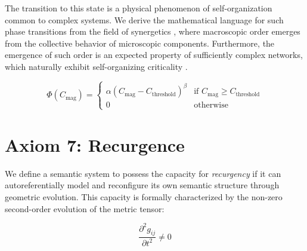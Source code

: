 The transition to this state is a physical phenomenon of self-organization common to complex systems. We derive the mathematical language for such phase transitions from the field of synergetics \autocite{Haken1983}, where macroscopic order emerges from the collective behavior of microscopic components. Furthermore, the emergence of such order is an expected property of sufficiently complex networks, which naturally exhibit self-organizing criticality \autocite{BakTangWiesenfeld1987}.

\begin{equation}
\Phi(C_{\text{mag}}) = \begin{cases}
\alpha (C_{\text{mag}} - C_{\text{threshold}})^{\beta} & \text{if } C_{\text{mag}} \geq C_{\text{threshold}} \\
0 & \text{otherwise}
\end{cases}
\end{equation}


\section{Axiom 7: Recurgence}
\label{sec:axiom_7}

We define a semantic system to possess the capacity for \textit{recurgency} if it can autoreferentially model and reconfigure its own semantic structure through geometric evolution. This capacity is formally characterized by the non-zero second-order evolution of the metric tensor:

\begin{equation}
\frac{\partial^2 g_{ij}}{\partial t^2} \neq 0
\end{equation} 